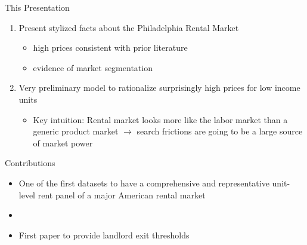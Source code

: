 \documentclass[10pt, xcolor=dvipsnames]{beamer}
\begin{document}
\begin{frame}{This Presentation}
    \begin{enumerate}
        \item Present stylized facts about the Philadelphia Rental Market
        \begin{itemize}
            \item high prices consistent with prior literature
            \item evidence of market segmentation
        \end{itemize}
         \pause
        \item Very preliminary model to rationalize surprisingly high prices for low income units
        \pause
        \begin{itemize}
            \item Key intuition: Rental market looks more like the labor market than a generic product market $\rightarrow$ search frictions are going to be a large source of market power
        \end{itemize}
    \end{enumerate}
    
\end{frame}

\begin{frame}{Contributions}

\begin{itemize}
    \item One of the first datasets to have a comprehensive and representative unit-level rent panel of a major American rental market
    \item 
    \item First paper to provide landlord exit thresholds 
\end{itemize}
    
\end{frame}
\end{document}

